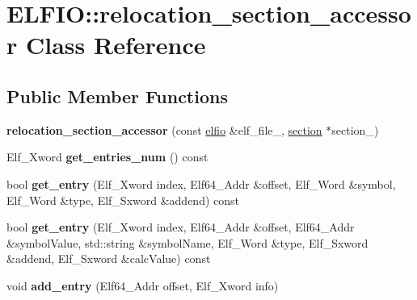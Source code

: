 \hypertarget{class_e_l_f_i_o_1_1relocation__section__accessor}{}\section{E\+L\+F\+IO\+:\+:relocation\+\_\+section\+\_\+accessor Class Reference}
\label{class_e_l_f_i_o_1_1relocation__section__accessor}
\subsection*{Public Member Functions}
\begin{DoxyCompactItemize}
\item 
{\bfseries relocation\+\_\+section\+\_\+accessor} (const \hyperlink{class_e_l_f_i_o_1_1elfio}{elfio} \&elf\+\_\+file\+\_\+, \hyperlink{class_e_l_f_i_o_1_1section}{section} $\ast$section\+\_\+)\hypertarget{class_e_l_f_i_o_1_1relocation__section__accessor_a91dec931c559e173d4a0a6397b5f81b7}{}\label{class_e_l_f_i_o_1_1relocation__section__accessor_a91dec931c559e173d4a0a6397b5f81b7}

\item 
Elf\+\_\+\+Xword {\bfseries get\+\_\+entries\+\_\+num} () const \hypertarget{class_e_l_f_i_o_1_1relocation__section__accessor_a43b7a8c1b819e5acd21c6c2e563488c3}{}\label{class_e_l_f_i_o_1_1relocation__section__accessor_a43b7a8c1b819e5acd21c6c2e563488c3}

\item 
bool {\bfseries get\+\_\+entry} (Elf\+\_\+\+Xword index, Elf64\+\_\+\+Addr \&offset, Elf\+\_\+\+Word \&symbol, Elf\+\_\+\+Word \&type, Elf\+\_\+\+Sxword \&addend) const \hypertarget{class_e_l_f_i_o_1_1relocation__section__accessor_a408e4dcd30b53e95a83b8e7a661eed19}{}\label{class_e_l_f_i_o_1_1relocation__section__accessor_a408e4dcd30b53e95a83b8e7a661eed19}

\item 
bool {\bfseries get\+\_\+entry} (Elf\+\_\+\+Xword index, Elf64\+\_\+\+Addr \&offset, Elf64\+\_\+\+Addr \&symbol\+Value, std\+::string \&symbol\+Name, Elf\+\_\+\+Word \&type, Elf\+\_\+\+Sxword \&addend, Elf\+\_\+\+Sxword \&calc\+Value) const \hypertarget{class_e_l_f_i_o_1_1relocation__section__accessor_a38035eaff67c9bb20671b6e7dde690bf}{}\label{class_e_l_f_i_o_1_1relocation__section__accessor_a38035eaff67c9bb20671b6e7dde690bf}

\item 
void {\bfseries add\+\_\+entry} (Elf64\+\_\+\+Addr offset, Elf\+\_\+\+Xword info)\hypertarget{class_e_l_f_i_o_1_1relocation__section__accessor_a8a08d1189caf893710c7b2ebb8485aa4}{}\label{class_e_l_f_i_o_1_1relocation__section__accessor_a8a08d1189caf893710c7b2ebb8485aa4}


\end{DoxyCompactItemize}
